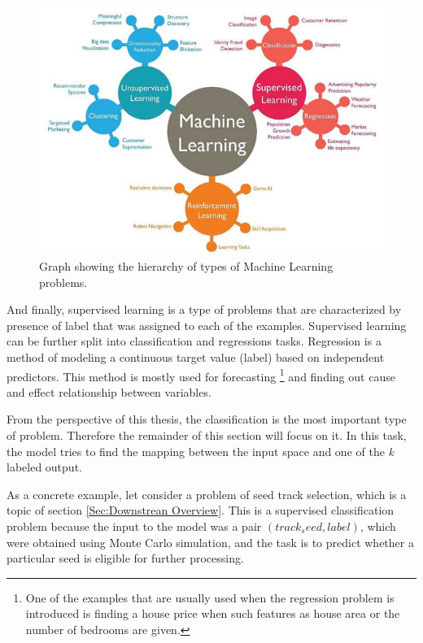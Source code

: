 \begin{figure}[h]
\centering
\includegraphics[scale=0.7]{figures/ML_types.png}
\caption{Graph showing the hierarchy of types of Machine Learning problems. 
\label{fig:ML_types}}
\end{figure}

And finally, supervised learning is a type of problems that are characterized by presence of label that was assigned to each of the examples. Supervised learning can be further split into classification and regressions tasks.
 Regression is a method of modeling a continuous target value (label) based on independent predictors. This method is mostly used for forecasting \footnote{One of the examples that are usually used when the regression problem is introduced is finding a house price when such features as house area or the number of bedrooms are given.} and finding out cause and effect relationship between variables. 
 

 From the perspective of this thesis, the classification is the most important type of problem. Therefore the remainder of this section will focus on it.  In this task, the model tries to find the mapping between the input space and one of the \textit{k} labeled output. 
 
As a concrete example, let consider a problem of seed track selection, which is a topic of section \ref{Sec:Downstrean Overview}. This is a supervised classification problem because the input to the model was a pair $(track_seed, label)$, which were obtained using Monte Carlo simulation, and the task is to predict whether a particular seed is eligible for further processing. 

